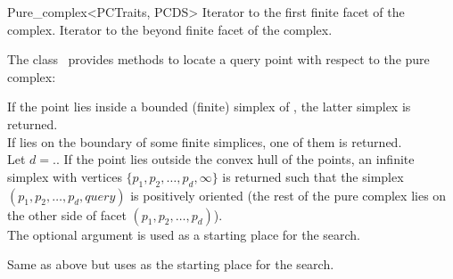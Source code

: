 \begin{ccRefClass}{Pure_complex<PCTraits, PCDS>}
{Iterator to the first finite facet of the complex.}
\ccGlue
{}
{Iterator to the beyond finite facet of the complex.}


The class \ccRefName\ provides methods to locate a query point with respect to
the pure complex:

{If the point  lies inside a bounded (finite) simplex of \ccVar,
the latter simplex is returned.\\
If  lies on the boundary of some finite simplices, one of them
is returned.\\
Let $d=$\ccVar.. If the point  lies
outside the convex hull of the points, an infinite simplex with vertices $\{
p_1, p_2, \ldots, p_d, \infty\}$ is returned such that the simplex $(p_1, p_2,
\ldots, p_d, query)$ is positively oriented (the rest of the pure complex lies
on the other side of facet $(p_1, p_2, \ldots, p_d)$).\\
The optional argument  is used as a starting place for the search.}

{Same as above but uses  as the starting place for the search.}


\end{ccRefClass}
